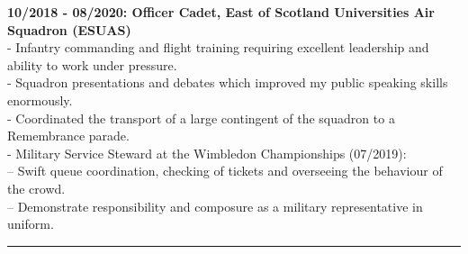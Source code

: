 \textbf{10/2018 - 08/2020: Officer Cadet, East of Scotland Universities Air Squadron (ESUAS)}\\
 - Infantry commanding and flight training requiring excellent leadership and ability to work under pressure.\\
 - Squadron presentations and debates which improved my public speaking skills enormously.\\
 - Coordinated the transport of a large contingent of the squadron to a Remembrance parade.\\
 - Military Service Steward at the Wimbledon Championships (07/2019):\\
    -- Swift queue coordination, checking of tickets and overseeing the behaviour of the crowd.\\
    -- Demonstrate responsibility and composure as a military representative in uniform.

\noindent\rule[0.5ex]{\linewidth}{1pt}


